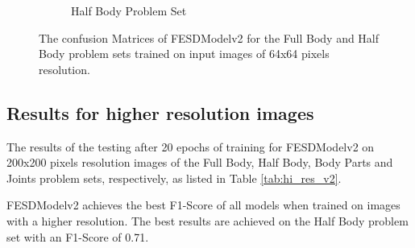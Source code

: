 \begin{figure}[htbp]
\begin{subfigure}[b]{0.4\linewidth}
      \caption{Half Body Problem Set}
      \label{fig:hb_conf}
  \end{subfigure}
  \caption[Confusion Matrices of FESDModelv2 (64x64 pixels input resolution)]{The confusion Matrices of FESDModelv2 for the Full Body and Half Body problem sets trained on input images of 64x64 pixels resolution.}
  \label{fig:conf_v2}
\end{figure}

\FloatBarrier

%
%
%
%
%
%
%
%
%
%
%
%
%
%
%

\subsection{Results for higher resolution images}

The results of the testing after 20 epochs of training for FESDModelv2 on 200x200 pixels resolution images of the Full Body, Half Body, Body Parts and Joints problem sets, respectively, as listed in Table \ref{tab:hi_res_v2}.



FESDModelv2 achieves the best F1-Score of all models when trained on images with a higher resolution. The best results are achieved on the Half Body problem set with an F1-Score of 0.71.

